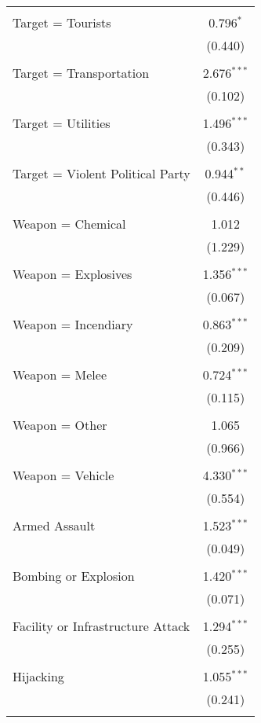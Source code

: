 \begin{table}[!htbp]
\begin{tabular}{@{\extracolsep{5pt}}lc}
  & \\ 
 Target = Tourists & 0.796$^{*}$ \\ 
  & (0.440) \\ 
  & \\ 
 Target = Transportation & 2.676$^{***}$ \\ 
  & (0.102) \\ 
  & \\ 
 Target = Utilities & 1.496$^{***}$ \\ 
  & (0.343) \\ 
  & \\ 
 Target = Violent Political Party & 0.944$^{**}$ \\ 
  & (0.446) \\ 
  & \\ 
 Weapon = Chemical & 1.012 \\ 
  & (1.229) \\ 
  & \\ 
 Weapon = Explosives & 1.356$^{***}$ \\ 
  & (0.067) \\ 
  & \\ 
 Weapon = Incendiary & 0.863$^{***}$ \\ 
  & (0.209) \\ 
  & \\ 
 Weapon = Melee & 0.724$^{***}$ \\ 
  & (0.115) \\ 
  & \\ 
 Weapon = Other & 1.065 \\ 
  & (0.966) \\ 
  & \\ 
 Weapon = Vehicle & 4.330$^{***}$ \\ 
  & (0.554) \\ 
  & \\ 
 Armed Assault & 1.523$^{***}$ \\ 
  & (0.049) \\ 
  & \\ 
 Bombing or Explosion & 1.420$^{***}$ \\ 
  & (0.071) \\ 
  & \\ 
 Facility or Infrastructure Attack & 1.294$^{***}$ \\ 
  & (0.255) \\ 
  & \\ 
 Hijacking & 1.055$^{***}$ \\ 
  & (0.241) \\ 
  & \\ 

\end{tabular}
\end{table}
